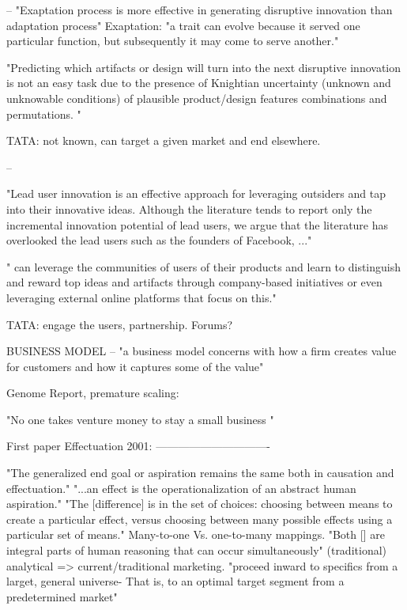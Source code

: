--
"Exaptation process is more effective in generating disruptive innovation than adaptation
 process"  \cite{managingDisruptiveInnovation}
Exaptation: "a trait can evolve because it served one particular function, but subsequently it may come to serve another."


 "Predicting which artifacts or design will turn into the next disruptive innovation is not an easy task
due to the presence of Knightian uncertainty (unknown and unknowable conditions) of plausible
product/design features combinations and permutations. "

TATA: not known, can target a given market and end elsewhere.

--
\cite{managingDisruptiveInnovation}

"Lead user innovation is an effective approach for leveraging outsiders and tap into their innovative
ideas. Although the literature tends to report only the incremental innovation potential of lead users,
we argue that the literature has overlooked the lead users such as the founders of Facebook, ..."

" can leverage the communities of users of their products and learn to distinguish and
reward top ideas and artifacts through company-based initiatives or even leveraging external online
platforms that focus on this."

TATA: engage the users, partnership. Forums?


BUSINESS MODEL
--
\cite{disruptiveInnovationToBusinessModelInnovation}
  "a business model concerns with how a firm creates value for customers and how it captures some of the value"

Genome Report, premature scaling:

 "No one takes venture money to stay a small business "

First paper Effectuation 2001:
-------------------------------

 "The generalized end goal or aspiration remains the same both in causation and effectuation."
"...an effect is the operationalization of an abstract human aspiration."
"The [difference] is in the set of choices: choosing between means to create a particular effect, versus choosing between many 
possible effects using a particular set of means." Many-to-one Vs. one-to-many mappings.
"Both [] are integral parts of human reasoning that can occur simultaneously"
(traditional)
 analytical => current/traditional marketing. 
 "proceed inward to specifics from a larget, general universe-
  That is, to an optimal target segment from a predetermined market"

